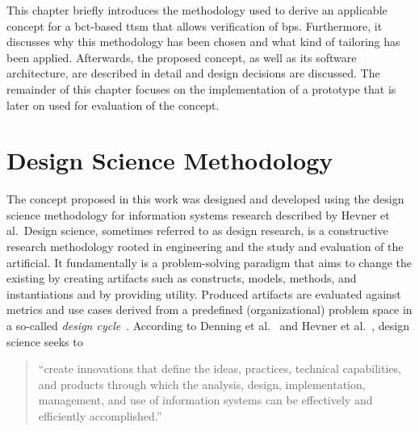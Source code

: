 \label{sec:ttsm}



This chapter briefly introduces the methodology used to derive an applicable concept for a \gls{bct}-based \gls{ttsm} that allows verification of \glspl{bp}. Furthermore, it discusses why this methodology has been chosen and what kind of tailoring has been applied. Afterwards, the proposed concept, as well as its software architecture, are described in detail and design decisions are discussed. The remainder of this chapter focuses on the implementation of a prototype that is later on used for evaluation of the concept.

\section{Design Science Methodology}
\label{sec:ttsm:methodology}
The concept proposed in this work was designed and developed using the design science methodology for information systems research described by Hevner et al.\ Design science, sometimes referred to as design research, is a constructive research methodology rooted in engineering and the study and evaluation of the artificial. It fundamentally is a problem-solving paradigm that aims to change the existing by creating artifacts such as constructs, models, methods, and instantiations and by providing utility. Produced artifacts are evaluated against metrics and use cases derived from a predefined (organizational) problem space in a so-called \textit{design cycle}~\cite{hevner2004_design_science}. According to Denning et al.~\cite{denning1997_design_science} and Hevner et al.~\cite{hevner2004_design_science}, design science seeks to

\begin{quote}
    ``create innovations that define the ideas, practices, technical capabilities, and products through which the analysis, design, implementation, management, and use of information systems can be effectively and efficiently accomplished.''~\cite[p.~76]{hevner2004_design_science}
\end{quote}

